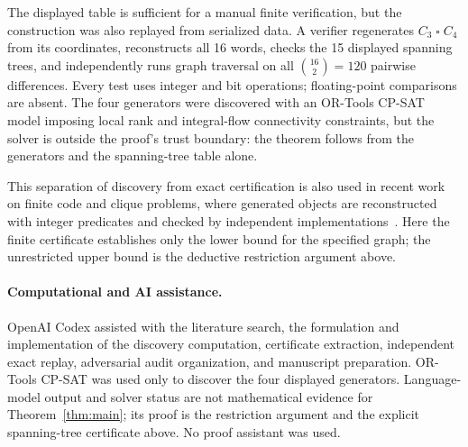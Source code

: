 \documentclass[11pt]{article}
\begin{document}
The displayed table is sufficient for a manual finite verification, but
the construction was also replayed from serialized data.  A verifier
regenerates $C_3\mathbin{\square}C_4$ from its coordinates, reconstructs
all 16 words, checks the 15 displayed spanning trees, and independently
runs graph traversal on all $\binom{16}{2}=120$ pairwise differences.
Every test uses integer and bit operations; floating-point comparisons are
absent.  The four generators were discovered with an OR-Tools CP-SAT
model imposing local rank and integral-flow connectivity constraints, but
the solver is outside the proof's trust boundary: the theorem follows
from the generators and the spanning-tree table alone.

This separation of discovery from exact certification is also used in
recent work on finite code and clique problems, where generated objects
are reconstructed with integer predicates and checked by independent
implementations~\cite[Sections~4 and 6]{ZengEtAl2026}.  Here the finite
certificate establishes only the lower bound for the specified graph;
the unrestricted upper bound is the deductive restriction argument above.

\paragraph{Computational and AI assistance.}
OpenAI Codex assisted with the literature search, the formulation and
implementation of the discovery computation, certificate extraction,
independent exact replay, adversarial audit organization, and manuscript
preparation.  OR-Tools CP-SAT was used only to discover the four displayed
generators.  Language-model output and solver status are not mathematical
evidence for Theorem~\ref{thm:main}; its proof is the restriction argument
and the explicit spanning-tree certificate above.  No proof assistant was
used.



\end{document}
